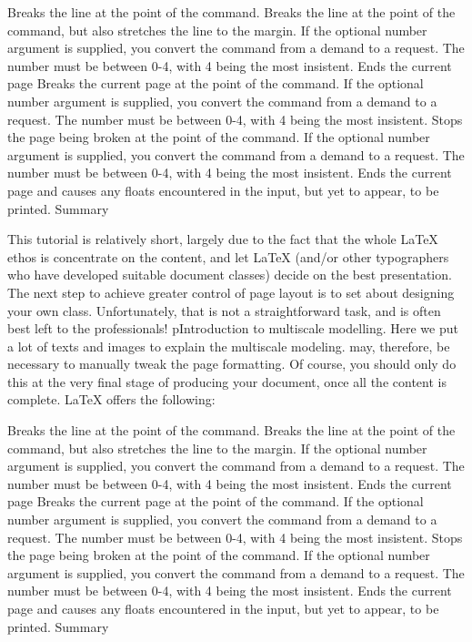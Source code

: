 \documentclass[a0paper]{article}
\begin{document}
\begin{multicols}{3}
Breaks the line at the point of the command.  Breaks the line at the point of
the command, but also stretches the line to the margin. If the optional number
argument is supplied, you convert the command from a demand to a request. The
number must be between 0-4, with 4 being the most insistent.  Ends the current
page Breaks the current page at the point of the command. If the optional number
argument is supplied, you convert the command from a demand to a request. The
number must be between 0-4, with 4 being the most insistent.  Stops the page
being broken at the point of the command. If the optional number argument is
supplied, you convert the command from a demand to a request. The number must be
between 0-4, with 4 being the most insistent.  Ends the current page and causes
any floats encountered in the input, but yet to appear, to be printed.  Summary

This tutorial is relatively short, largely due to the fact that the whole LaTeX
ethos is concentrate on the content, and let LaTeX (and/or other typographers
who have developed suitable document classes) decide on the best presentation.
The next step to achieve greater control of page layout is to set about
designing your own class. Unfortunately, that is not a straightforward task, and
is often best left to the professionals! 
pIntroduction to multiscale modelling. Here we put a lot of texts and images to
explain the multiscale modeling.  may, therefore, be necessary to manually tweak
the page formatting. Of course, you should only do this at the very final stage
of producing your document, once all the content is complete. LaTeX offers the
following:


Breaks the line at the point of the command.  Breaks the line at the point of
the command, but also stretches the line to the margin. If the optional number
argument is supplied, you convert the command from a demand to a request. The
number must be between 0-4, with 4 being the most insistent.  Ends the current
page Breaks the current page at the point of the command. If the optional number
argument is supplied, you convert the command from a demand to a request. The
number must be between 0-4, with 4 being the most insistent.  Stops the page
being broken at the point of the command. If the optional number argument is
supplied, you convert the command from a demand to a request. The number must be
between 0-4, with 4 being the most insistent.  Ends the current page and causes
any floats encountered in the input, but yet to appear, to be printed.  Summary


\end{multicols}
\end{document}
